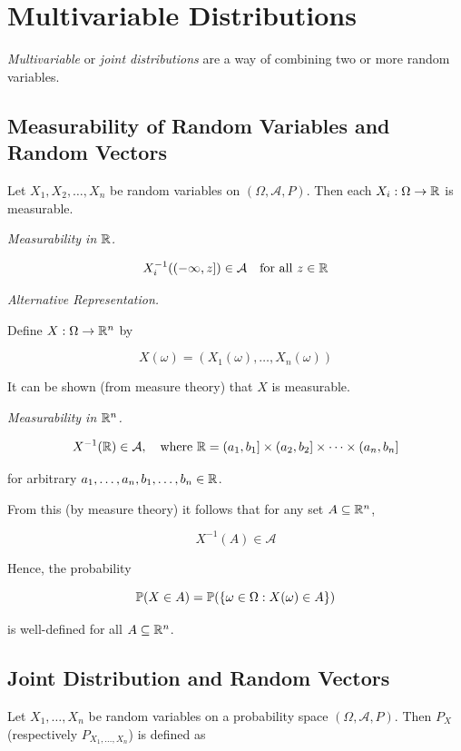\chapter{Multivariable Distributions}

\emph{Multivariable} or \emph{joint distributions} are a way of combining two or more random variables.

\section{Measurability of Random Variables and Random Vectors}

Let \( X_1, X_2, \ldots, X_n \) be random variables on \((\Omega, \mathcal{A}, P)\).
Then each \( X_i : \Omega \to \mathbb{R} \) is measurable.

\emph{Measurability in \(\mathbb{R}\).}

\[
    X_i^{-1}((-\infty, z]) \in \mathcal{A} \quad \text{for all } z \in \mathbb{R}
\]

\emph{Alternative Representation.}

Define \( X : \Omega \to \mathbb{R}^n \) by

\[
    X(\omega) = (X_1(\omega), \ldots, X_n(\omega))
\]

It can be shown (from measure theory) that \( X \) is measurable.

\emph{Measurability in \(\mathbb{R}^n\).}

\[
    X^{-1}(\mathbb{R}) \in \mathcal{A}, \quad \text{where }
    \mathbb{R} = (a_1, b_1] \times (a_2, b_2] \times \cdots \times (a_n, b_n]
\]

for arbitrary \( a_1, \ldots, a_n, b_1, \ldots, b_n \in \mathbb{R} \).

From this (by measure theory) it follows that for any set \( A \subseteq \mathbb{R}^n \),

\[
    X^{-1}(A) \in \mathcal{A}
\]

Hence, the probability

\[
    \mathbb{P}(X \in A) = \mathbb{P}(\{\omega \in \Omega : X(\omega) \in A\})
\]

is well-defined for all \( A \subseteq \mathbb{R}^n \).

\section{Joint Distribution and Random Vectors}

Let \( X_1, \ldots, X_n \) be random variables on a probability space \((\Omega, \mathcal{A}, P)\).
Then \( P_X \) (respectively \( P_{X_1, \ldots, X_n} \)) is defined as

